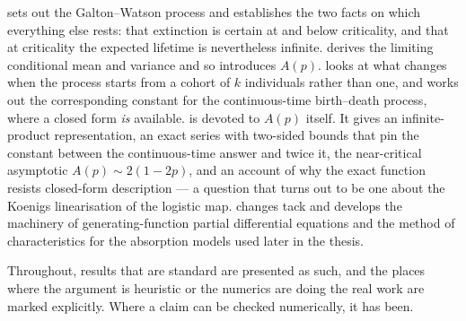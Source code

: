  sets out the Galton--Watson process and establishes the two facts on
which everything else rests: that extinction is certain at and below criticality,
and that at criticality the expected lifetime is nevertheless infinite.
 derives the limiting conditional mean and variance and so introduces
$A(p)$.  looks at what changes when the process starts from a cohort
of $k$ individuals rather than one, and works out the corresponding constant for the
continuous-time birth--death process, where a closed form \emph{is} available.
 is devoted to $A(p)$ itself. It gives an infinite-product
representation, an exact series with two-sided bounds that pin the constant between
the continuous-time answer and twice it, the near-critical asymptotic
$A(p)\sim2(1-2p)$, and an account of why the exact function resists closed-form
description --- a question that turns out to be one about the Koenigs linearisation
of the logistic map.  changes tack and develops the machinery of
generating-function partial differential equations and the method of characteristics
for the absorption models used later in the thesis.

Throughout, results that are standard are presented as such, and the places where
the argument is heuristic or the numerics are doing the real work are marked
explicitly. Where a claim can be checked numerically, it has been.
